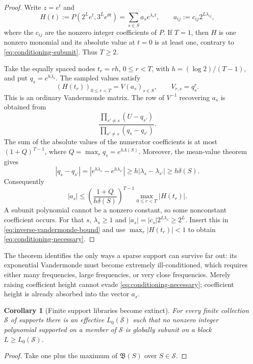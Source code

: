 \documentclass[11pt,oneside]{article}
\newtheorem{corollary}[theorem]{Corollary}
\theoremstyle{definition}
\theoremstyle{remark}
\newcommand{\tht}{\theta}
\begin{document}
\begin{proof}
Write $z=e^t$ and
\[
  H(t):=P(2^Le^t,3^Le^{\tht t})
       =\sum_{s\in S}a_s e^{\lambda_st},
  \qquad a_{ij}:=c_{ij}2^{L\lambda_{ij}},
\]
where the $c_{ij}$ are the nonzero integer coefficients of $P$.  If $T=1$, then $H$ is one
nonzero monomial and its absolute value at $t=0$ is at least one, contrary to
\eqref{eq:conditioning-subunit}.  Thus $T\ge2$.

Take the equally spaced nodes $t_r=rh$, $0\le r<T$, with $h=(\log2)/(T-1)$, and put
$q_s=e^{h\lambda_s}$.  The sampled values satisfy
\[
  (H(t_r))_{0\le r<T}=V(a_s)_{s\in S},
  \qquad V_{r,s}=q_s^r.
\]
This is an ordinary Vandermonde matrix.  The row of $V^{-1}$ recovering $a_s$ is obtained from
\[
  \frac{\prod_{s'\ne s}(U-q_{s'})}{\prod_{s'\ne s}(q_s-q_{s'})}.
\]
The sum of the absolute values of the numerator coefficients is at most
$(1+Q)^{T-1}$, where $Q=\max_sq_s=e^{h\Lambda(S)}$.  Moreover, the mean-value theorem gives
\[
 |q_s-q_{s'}|=|e^{h\lambda_s}-e^{h\lambda_{s'}}|
 \ge h|\lambda_s-\lambda_{s'}|\ge h\delta(S).
\]
Consequently
\begin{equation}
  |a_s|\le
  \left(\frac{1+Q}{h\delta(S)}\right)^{T-1}
  \max_{0\le r<T}|H(t_r)|.
  \label{eq:inverse-vandermonde-bound}
\end{equation}
A subunit polynomial cannot be a nonzero constant, so some nonconstant coefficient occurs.
For that $s$, $\lambda_s\ge1$ and $|a_s|=|c_s|2^{L\lambda_s}\ge2^L$.  Insert this in
\eqref{eq:inverse-vandermonde-bound} and use $\max_r|H(t_r)|<1$ to obtain
\eqref{eq:conditioning-necessary}.
\end{proof}

The theorem identifies the only ways a sparse support can survive far out: its exponential
Vandermonde must become extremely ill-conditioned, which requires either many frequencies, large
frequencies, or very close frequencies.  Merely raising coefficient height cannot evade
\eqref{eq:conditioning-necessary}; coefficient height is already absorbed into the vector $a_s$.

\begin{corollary}[Finite support libraries become extinct]
\label{cor:finite-library}
For every finite collection $\mathscr S$ of supports there is an effective $L_0(\mathscr S)$ such
that no nonzero integer polynomial supported on a member of $\mathscr S$ is globally subunit on a
block $L\ge L_0(\mathscr S)$.
\end{corollary}

\begin{proof}
Take one plus the maximum of $\mathfrak B(S)$ over $S\in\mathscr S$.
\end{proof}
\end{document}
